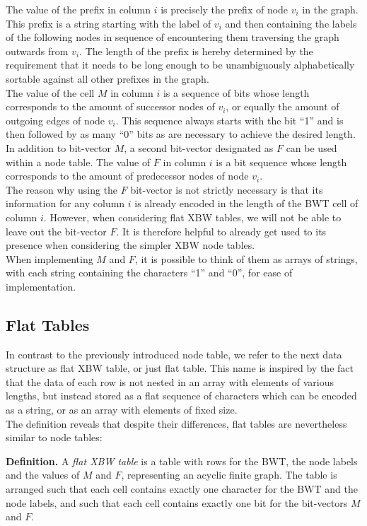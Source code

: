 \documentclass[a4paper,12pt,twoside,BCOR=10mm]{scrbook}
\begin{document}
The value of the prefix in column $ i $ is precisely the prefix of node $ v_i $ in the graph.
This prefix is a string starting with the label of $ v_i $ and then containing
the labels of the following nodes in sequence of encountering them traversing
the graph outwards from $ v_i $. The length of the prefix is hereby determined by the 
requirement that it needs to be long enough to be unambiguously alphabetically sortable 
against all other prefixes in the graph. \\
The value of the cell $ M $ in column $ i $ is a sequence of bits whose length corresponds to
the amount of successor nodes of $ v_i $, or equally the amount of outgoing edges of node $ v_i $.
This sequence always starts with the bit “1” and is then followed
by as many “0” bits as are necessary to achieve the desired length.
In addition to bit-vector $ M $, a second bit-vector designated as $ F $ can be used within a node table.
The value of $ F $ in column $ i $ is a bit sequence whose length corresponds to
the amount of predecessor nodes of node $ v_i $. \\
The reason why using the $ F $ bit-vector is not strictly necessary is that its information
for any column $ i $ is already encoded in the length of the BWT cell of column $ i $.
However, when considering flat XBW tables, we will not be able to leave out the bit-vector $ F $.
It is therefore helpful to already get used to its presence when considering the simpler XBW node tables. \\
When implementing $ M $ and $ F $, it is possible to think of them as arrays of strings,
with each string containing the characters “1” and “0”, for ease of implementation.

\subsection{Flat Tables}
\label{sec:flat_table_definition}

In contrast to the previously introduced node table,
we refer to the next data structure as flat XBW table, or just flat table.
This name is inspired by the fact that the data of each row is not
nested in an array with elements of various lengths,
but instead stored as a flat sequence of characters which can be encoded as a string,
or as an array with elements of fixed size. \\
The definition reveals that despite their differences,
flat tables are nevertheless similar to node tables:

\textbf{Definition.} A \textit{flat XBW table}\label{def:flat_table} is a table with rows for the BWT,
the node labels and the values of $ M $ and $ F $,
representing an acyclic finite graph.
The table is arranged such that each cell contains exactly one character
for the BWT and the node labels, and such that each cell contains exactly
one bit for the bit-vectors $ M $ and $ F $.
\end{document}

